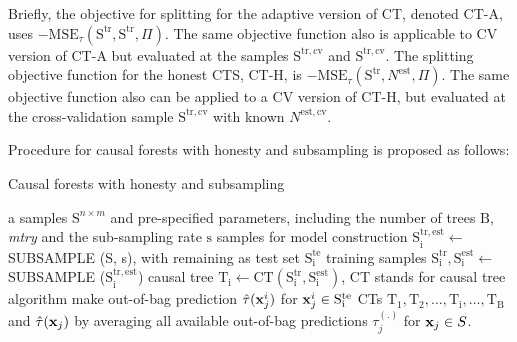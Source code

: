     Briefly, the objective for splitting for the adaptive version of CT, denoted CT-A, uses $-\mathrm{MSE}_\tau (\mathrm{S^{tr}}, \mathrm{S^{tr}}, \Pi)$. The same objective function also is applicable to CV version of CT-A but evaluated at the samples $\mathrm{S^{tr, cv}}$ and $\mathrm{S^{tr,cv}}$. The splitting objective function for the honest CTS, CT-H, is $-\mathrm{MSE}_\tau (\mathrm{S^{tr}}, N^{\mathrm{est}}, \Pi)$. The same objective function also can be applied to a CV version of CT-H, but evaluated at the cross-validation sample $\mathrm{S^{tr, cv}}$ with known $N^{\mathrm{est, cv}}$.

    Procedure for causal forests with honesty and subsampling is proposed as follows:
    \setlength{\intextsep}{0pt} 
    \begin{algorithm}[htbp]
      \caption{Causal forests with honesty and subsampling}
      \label{alg:ct}
      \begin{algorithmic}[1]
        \REQUIRE a samples $\mathrm{S}^{n \times m}$ and pre-specified parameters, including the number of trees $\mathrm{B}$, \textit{mtry} and the sub-sampling rate $\mathrm{s}$ 
          \STATE samples for model construction $\mathrm{S_i^{tr, est}} \leftarrow$ \uppercase{Subsample} (S, s), with remaining as test set $\mathrm{S_i^{te}}$
          \STATE training samples $\mathrm{S_i^{tr}, S_i^{est}} \leftarrow$ \uppercase{Subsample} ($\mathrm{S_i^{tr, est}}$)
          \STATE causal tree $\mathrm{T_i} \leftarrow \mathrm{CT} (\mathrm{S_i^{tr}, S_i^{est}})$, CT stands for causal tree algorithm
          \STATE make out-of-bag prediction $\hat{\tau}(\mathbf{x}_j^i)$ for $\mathbf{x}_j^i \in \mathrm{S_i^{te}}$
        \ENDFOR
        \RETURN CTs $\mathrm{T_1}, \mathrm{T_2}, \dots , \mathrm{T_i}, \dots, \mathrm{T_B}$ and $\hat{\tau}(\mathbf{x}_j)$ by averaging all available out-of-bag predictions $\tau_j^{(.)}$ for $\mathbf{x}_{j} \in S$.
      \end{algorithmic}
    \end{algorithm}

